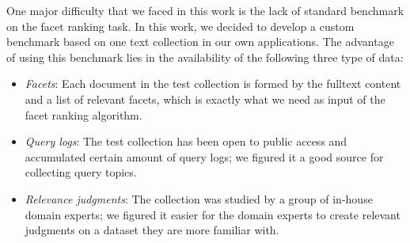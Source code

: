 
One major difficulty that we faced in this work is the lack of standard
benchmark on the facet ranking task.  In this work, we decided to develop a
custom benchmark based on one text collection in our own applications.  The
advantage of using this benchmark lies in the availability of the following
three type of data:
\begin{itemize} \item \emph{Facets}: Each document in the test collection is
formed by the fulltext content and a list of relevant facets, which is exactly
what we need as input of the facet ranking algorithm.  \item \emph{Query logs}:
The test collection has been open to public access and accumulated certain
amount of query logs; we figured it a good source for collecting query topics.
\item \emph{Relevance judgments}: The collection was studied by a group of
in-house domain experts; we figured it easier for the domain experts to create
relevant judgments on a dataset they are more familiar with.  \end{itemize}

